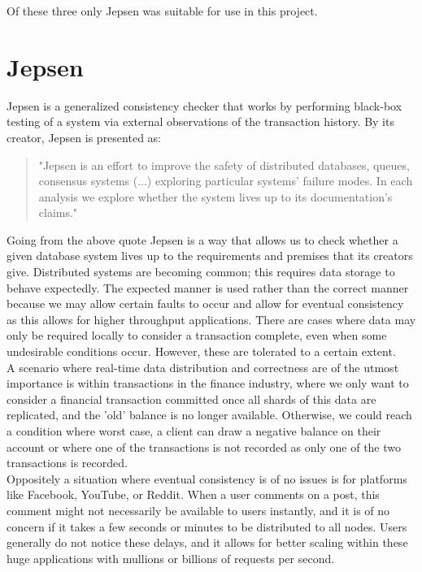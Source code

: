 \documentclass[a4paper,10pt,titlepage]{report}
\begin{document}
Of these three only Jepsen was suitable for use in this project.

\section{Jepsen}
Jepsen is a generalized consistency checker that works by performing black-box testing of a system via external observations of the transaction history. By its creator, Jepsen is presented as:
\begin{quote}
    "Jepsen is an effort to improve the safety of distributed databases, queues, consensus systems  (...) exploring particular systems' failure modes. In each analysis we explore whether the system lives up to its documentation's claims."\cite{jepsonio}
\end{quote}

\vspace{5mm}

Going from the above quote Jepsen is a way that allows us to check whether a given database system lives up to the requirements and premises that its creators give. Distributed systems are becoming common; this requires data storage to behave expectedly. The expected manner is used rather than the correct manner because we may allow certain faults to occur and allow for eventual consistency as this allows for higher throughput applications. There are cases where data may only be required locally to consider a transaction complete, even when some undesirable conditions occur. However, these are tolerated to a certain extent. \\

A scenario where real-time data distribution and correctness are of the utmost importance is within transactions in the finance industry, where we only want to consider a financial transaction committed once all shards of this data are replicated, and the 'old' balance is no longer available. Otherwise, we could reach a condition where worst case, a client can draw a negative balance on their account or where one of the transactions is not recorded as only one of the two transactions is recorded.\\

Oppositely a situation where eventual consistency is of no issues is for platforms like Facebook, YouTube, or Reddit. When a user comments on a post, this comment might not necessarily be available to users instantly, and it is of no concern if it takes a few seconds or minutes to be distributed to all nodes. Users generally do not notice these delays, and it allows for better scaling within these huge applications with mullions or billions of requests per second.\\
\end{document}
